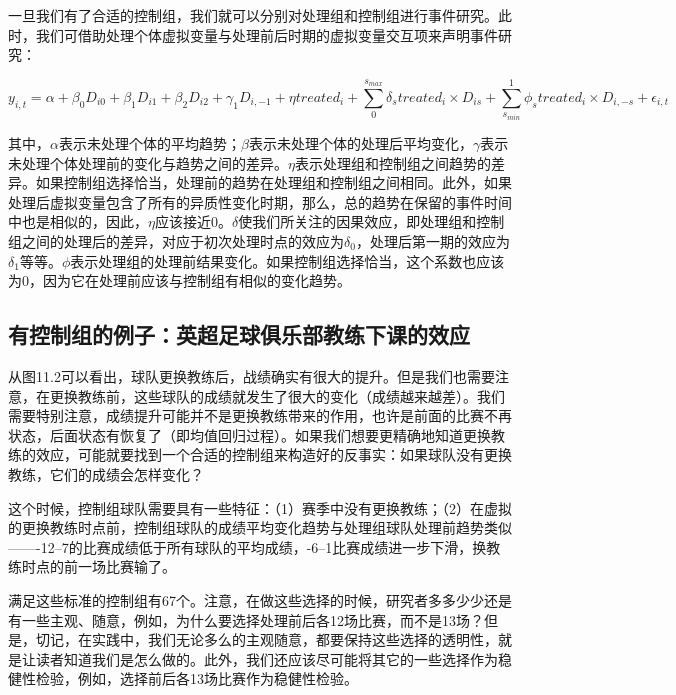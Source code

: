 \documentclass[cn,12pt,math=newtx,citestyle=gb7714-2015,bibstyle=gb7714-2015]{elegantbook}
\begin{document}
	   一旦我们有了合适的控制组，我们就可以分别对处理组和控制组进行事件研究。此时，我们可借助处理个体虚拟变量与处理前后时期的虚拟变量交互项来声明事件研究：
	   
	    \begin{equation}
	    	 y_{i,t} = \alpha + \beta_0 D_{i0} + \beta_1 D_{i1} + \beta_2 D_{i2} + \gamma_1 D_{i,-1}+\eta treated_i+\sum_0^{s_{max}}\delta_s treated_i \times D_{is}+\sum_{s_{min}}^1 \phi_s treated_i \times D_{i,-s}+\epsilon_{i,t}
	    \end{equation}
	    
	    其中，$ \alpha $表示未处理个体的平均趋势；$\beta$表示未处理个体的处理后平均变化，$\gamma$表示未处理个体处理前的变化与趋势之间的差异。$\eta$表示处理组和控制组之间趋势的差异。如果控制组选择恰当，处理前的趋势在处理组和控制组之间相同。此外，如果处理后虚拟变量包含了所有的异质性变化时期，那么，总的趋势在保留的事件时间中也是相似的，因此，$\eta$应该接近0。$\delta$使我们所关注的因果效应，即处理组和控制组之间的处理后的差异，对应于初次处理时点的效应为$\delta_0$，处理后第一期的效应为$\delta_1$等等。$\phi$表示处理组的处理前结果变化。如果控制组选择恰当，这个系数也应该为0，因为它在处理前应该与控制组有相似的变化趋势。
	    
	    \subsection*{有控制组的例子：英超足球俱乐部教练下课的效应}
	    
	    从图11.2可以看出，球队更换教练后，战绩确实有很大的提升。但是我们也需要注意，在更换教练前，这些球队的成绩就发生了很大的变化（成绩越来越差）。我们需要特别注意，成绩提升可能并不是更换教练带来的作用，也许是前面的比赛不再状态，后面状态有恢复了（即均值回归过程）。如果我们想要更精确地知道更换教练的效应，可能就要找到一个合适的控制组来构造好的反事实：如果球队没有更换教练，它们的成绩会怎样变化？
	    
	    这个时候，控制组球队需要具有一些特征：（1）赛季中没有更换教练；（2）在虚拟的更换教练时点前，控制组球队的成绩平均变化趋势与处理组球队处理前趋势类似——-12--7的比赛成绩低于所有球队的平均成绩，-6--1比赛成绩进一步下滑，换教练时点的前一场比赛输了。
	    
	    满足这些标准的控制组有67个。注意，在做这些选择的时候，研究者多多少少还是有一些主观、随意，例如，为什么要选择处理前后各12场比赛，而不是13场？但是，切记，在实践中，我们无论多么的主观随意，都要保持这些选择的透明性，就是让读者知道我们是怎么做的。此外，我们还应该尽可能将其它的一些选择作为稳健性检验，例如，选择前后各13场比赛作为稳健性检验。
	    
\end{document}

